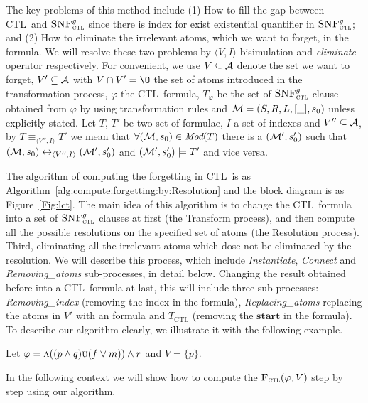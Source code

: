 \documentclass[runningheads]{llncs}
\newcommand{\tuple}[1]{{\langle{#1}\rangle}}
\newcommand{\Mod}{\textit{Mod}}
\newcommand{\lrto}{\leftrightarrow}
\newcommand{\Hm} {{\cal M}}
\newcommand{\Ha} {{\cal A}}
\newcommand{\start}{\textbf{start}}
\newcommand{\CTL}{\textrm{CTL}}
\newcommand{\ALL}{\textsc{a}}
\newcommand{\UNTIL}{\textsc{u}}
\newcommand{\CTLsnf}{{\textsc{SNF}_{\textsc{ctl}}^g}}
\newcommand{\CTLforget}{{\textsc{F}_{\textsc{ctl}}}}
\begin{document}
The key problems of this method include (1) How to fill the gap between \CTL\ and $\CTLsnf$ since there is index for exist existential quantifier in $\CTLsnf$; and (2) How to eliminate the irrelevant atoms, which we want to forget, in the formula.
We will resolve these two problems by $\tuple{V,I}$-bisimulation and \emph{eliminate} operator respectively.
For convenient, we use $V\subseteq \Ha$ denote the set we want to forget, $V' \subseteq \Ha$ with $V \cap V'={\O}$ the set of atoms introduced in the transformation process, $\varphi$  the \CTL\ formula, $T_{\varphi}$ be the set of $\CTLsnf$ clause obtained from $\varphi$ by using transformation rules  and $\Hm=(S,R,L,[\_], s_0)$ unless explicitly stated.
 Let $T$, $T'$ be two set of formulae, $I$ a set of indexes and $V''\subseteq \Ha$, by $T\equiv_{\tuple{V'', I}} T'$ we mean that $\forall (\Hm, s_0) \in \Mod(T)$ there is a $(\Hm', s_0')$ such that $(\Hm,s_0) \lrto_{\tuple{V'', I}} (\Hm',s_0')$ and $(\Hm', s_0') \models T'$ and vice versa.







The algorithm of computing the forgetting in \CTL\ is as Algorithm~\ref{alg:compute:forgetting:by:Resolution} and the block diagram is as Figure~\ref{Fig:lct}.
The main idea of this algorithm is to change the \CTL\ formula into a set of $\CTLsnf$ clauses at first (the Transform process), and then compute all the possible resolutions on the specified set of atoms (the Resolution process). Third, eliminating all the irrelevant atoms which dose not be eliminated by the resolution. We will describe this process, which include \emph{Instantiate}, \emph{Connect} and \emph{Removing\_atoms} sub-processes, in detail below.
Changing the result obtained before into a \CTL\ formula at last, this will include three sub-processes: \emph{Removing\_index} (removing the index in the formula), \emph{Replacing\_atoms} replacing the atoms in $V'$ with an formula and $T_\CTL$ (removing the $\start$ in the formula).
To describe our algorithm clearly, we illustrate it with the following example.
\begin{example}\label{main:examp}
Let $\varphi=\ALL((p\wedge q) \UNTIL (f\vee m)) \wedge r$ and $V=\{p\}$.
\end{example}
In the following context we will show how to compute the $\CTLforget(\varphi, V)$ step by step using our algorithm.
\end{document}
